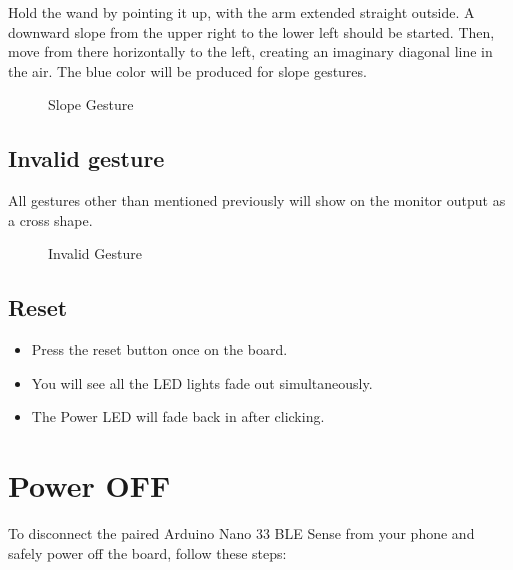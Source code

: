 Hold the wand by pointing it up, with the arm extended straight outside. A downward slope from the upper right to the lower left should be started. Then, move from there horizontally to the left, creating an imaginary diagonal line in the air. The blue color will be produced for slope gestures. 


\begin{figure}[h!]
	\centering
{}
\caption{Slope Gesture}
\end{figure}

\section{Invalid gesture}

All gestures other than mentioned previously will show on the monitor output as a cross shape.
\begin{figure}[h!]
\centering
{}
\caption{Invalid Gesture}
\end{figure}

\section{Reset}

\begin{itemize}
	\item Press the reset button once on the board.
	
	\item You will see all the LED lights fade out simultaneously.
	
	\item The Power LED will fade back in after clicking.
\end{itemize}

\chapter{Power OFF}

To disconnect the paired Arduino Nano 33 BLE Sense from your phone and safely
power off the board, follow these steps:

